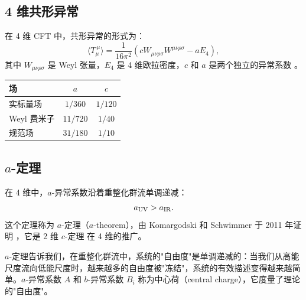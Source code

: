 \subsection{4 维共形异常}

\begin{theorem}[4 维共形异常]
在 4 维 CFT 中，共形异常的形式为：
\begin{equation}
    \langle T_\mu^{~\mu} \rangle = \frac{1}{16\pi^2} \left( c W_{\mu\nu\rho\sigma} W^{\mu\nu\rho\sigma} - a E_4 \right),
\end{equation}
其中 $W_{\mu\nu\rho\sigma}$ 是 Weyl 张量，$E_4$ 是 4 维欧拉密度，$c$ 和 $a$ 是两个独立的异常系数 \cite{Henningson1998}。
\end{theorem}

\begin{example}[自由场的异常系数]
\begin{center}
\begin{tabular}{|l|c|c|}
\hline
\textbf{场} & $a$ & $c$ \\
\hline
实标量场 & $1/360$ & $1/120$ \\
Weyl 费米子 & $11/720$ & $1/40$ \\
规范场 & $31/180$ & $1/10$ \\
\hline
\end{tabular}
\end{center}
\end{example}

\subsection{$a$-定理}

\begin{theorem}[$a$-定理]
在 4 维中，$a$-异常系数沿着重整化群流单调递减：
\begin{equation}
    a_{\rm UV} > a_{\rm IR}.
\end{equation}
这个定理称为 $a$-定理（$a$-theorem），由 Komargodski 和 Schwimmer 于 2011 年证明 \cite{Komargodski2011}，它是 2 维 $c$-定理 \cite{Zamolodchikov1986} 在 4 维的推广。
\end{theorem}

\begin{note}[物理意义]
$a$-定理告诉我们，在重整化群流中，系统的"自由度"是单调递减的：当我们从高能尺度流向低能尺度时，越来越多的自由度被"冻结"，系统的有效描述变得越来越简单。$a$-异常系数 $A$ 和 $b$-异常系数 $B_i$ 称为中心荷（central charge），它度量了理论的"自由度"。
\end{note}


